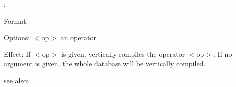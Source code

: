 \verti:

Format: 

Options: $<$op$>$ an operator

Effect: If $<$op$>$ is given,  vertically compiles the
	operator $<$op$>$.
	If no argument is given, the whole database  will
	be vertically compiled.

see also: \consult
